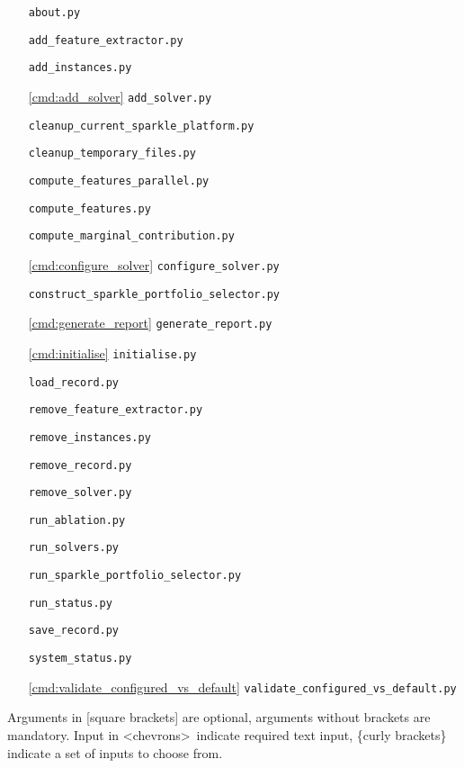 \documentclass{article}
\begin{document}
\begin{itemize}[noitemsep]
  \item[] \texttt{about.py}
  \item[] \texttt{add\_feature\_extractor.py}
  \item[] \texttt{add\_instances.py}
  \item[\ref{cmd:add_solver}] \texttt{add\_solver.py}
  \item[] \texttt{cleanup\_current\_sparkle\_platform.py}
  \item[] \texttt{cleanup\_temporary\_files.py}
  \item[] \texttt{compute\_features\_parallel.py}
  \item[] \texttt{compute\_features.py}
  \item[] \texttt{compute\_marginal\_contribution.py}
  \item[\ref{cmd:configure_solver}] \texttt{configure\_solver.py}
  \item[] \texttt{construct\_sparkle\_portfolio\_selector.py}
  \item[\ref{cmd:generate_report}] \texttt{generate\_report.py}
  \item[\ref{cmd:initialise}] \texttt{initialise.py}
  \item[] \texttt{load\_record.py}
  \item[] \texttt{remove\_feature\_extractor.py}
  \item[] \texttt{remove\_instances.py}
  \item[] \texttt{remove\_record.py}
  \item[] \texttt{remove\_solver.py}
  \item[] \texttt{run\_ablation.py}
  \item[] \texttt{run\_solvers.py}
  \item[] \texttt{run\_sparkle\_portfolio\_selector.py}
  \item[] \texttt{run\_status.py}
  \item[] \texttt{save\_record.py}
  \item[] \texttt{system\_status.py}
  \item[\ref{cmd:validate_configured_vs_default}] \texttt{validate\_configured\_vs\_default.py}
\end{itemize}

Arguments in [square brackets] are optional, arguments without brackets are mandatory. Input in \textless chevrons\textgreater~indicate required text input, \{curly brackets\} indicate a set of inputs to choose from.
\end{document}
